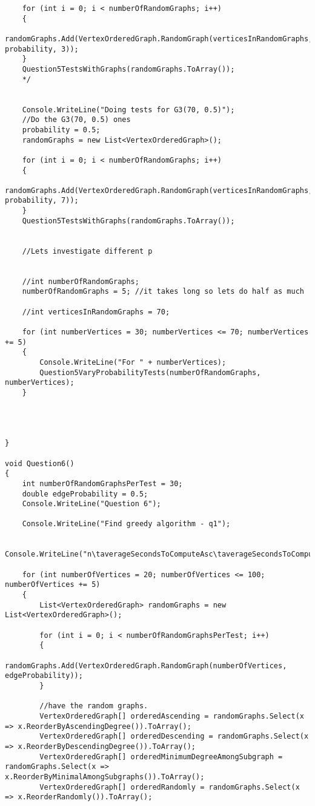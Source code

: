 \documentclass{article}
\begin{document}
\begin{lstlisting}
	for (int i = 0; i < numberOfRandomGraphs; i++)
	{
		randomGraphs.Add(VertexOrderedGraph.RandomGraph(verticesInRandomGraphs, probability, 3));
	}
	Question5TestsWithGraphs(randomGraphs.ToArray());
	*/
	
	
	Console.WriteLine("Doing tests for G3(70, 0.5)");
	//Do the G3(70, 0.5) ones
	probability = 0.5;
	randomGraphs = new List<VertexOrderedGraph>();
	
	for (int i = 0; i < numberOfRandomGraphs; i++)
	{
		randomGraphs.Add(VertexOrderedGraph.RandomGraph(verticesInRandomGraphs, probability, 7));
	}
	Question5TestsWithGraphs(randomGraphs.ToArray());
	
	
	//Lets investigate different p
	
	
	//int numberOfRandomGraphs;
	numberOfRandomGraphs = 5; //it takes long so lets do half as much
	
	//int verticesInRandomGraphs = 70;
	
	for (int numberVertices = 30; numberVertices <= 70; numberVertices += 5)
	{
		Console.WriteLine("For " + numberVertices);
		Question5VaryProbabilityTests(numberOfRandomGraphs, numberVertices);
	}
	
	
	
	
}

void Question6()
{
	int numberOfRandomGraphsPerTest = 30;
	double edgeProbability = 0.5;
	Console.WriteLine("Question 6");
	
	Console.WriteLine("Find greedy algorithm - q1");
	
	Console.WriteLine("n\taverageSecondsToComputeAsc\taverageSecondsToComputeDsc\taverageSecondsToComputeMinimalAmong\taverageSecondsToComputeRandom");
	
	for (int numberOfVertices = 20; numberOfVertices <= 100; numberOfVertices += 5)
	{
		List<VertexOrderedGraph> randomGraphs = new List<VertexOrderedGraph>();
		
		for (int i = 0; i < numberOfRandomGraphsPerTest; i++)
		{
			randomGraphs.Add(VertexOrderedGraph.RandomGraph(numberOfVertices, edgeProbability));
		}
		
		//have the random graphs.
		VertexOrderedGraph[] orderedAscending = randomGraphs.Select(x => x.ReorderByAscendingDegree()).ToArray();
		VertexOrderedGraph[] orderedDescending = randomGraphs.Select(x => x.ReorderByDescendingDegree()).ToArray();
		VertexOrderedGraph[] orderedMinimumDegreeAmongSubgraph = randomGraphs.Select(x => x.ReorderByMinimalAmongSubgraphs()).ToArray();
		VertexOrderedGraph[] orderedRandomly = randomGraphs.Select(x => x.ReorderRandomly()).ToArray();
		

\end{lstlisting}
\end{document}
